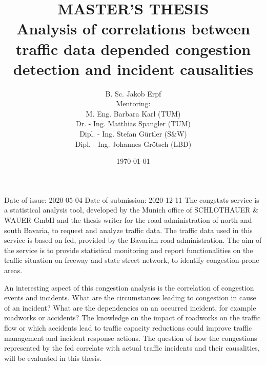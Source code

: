 \documentclass[a4paper,12pt]{report}
\begin{document}
\showthe\textwidth

\title{MASTER'S THESIS\\
[1cm]
\smaller Analysis of correlations between traffic data depended congestion detection and incident causalities}
\author{
B. Sc. Jakob Erpf\\ 
[1cm]
\small Mentoring:\\ 
\small M. Eng. Barbara Karl (TUM)\\ 
\small Dr. - Ing. Matthias Spangler (TUM)\\ 
\small Dipl. - Ing. Stefan Gürtler (S\&W)\\
\small Dipl. - Ing. Johannes Grötsch (LBD)
}
\date{\today}
\maketitle

\clearpage

\renewcommand\abstractname{Topic}
\abstract{}
Date of issue: 2020-05-04\newline
Date of submission:	2020-12-11\newline
\newline
The \gls{congstats} service is a statistical analysis tool, developed by the Munich office of SCHLOTHAUER \& WAUER GmbH and the thesis writer for the road administration of north and south Bavaria, to request and analyze traffic data. The traffic data used in this service is based on \acrfull{fcd}, provided by the Bavarian road administration. The aim of the service is to provide statistical monitoring and report functionalities on the traffic situation on freeway and state street network, to identify congestion-prone areas.

An interesting aspect of this congestion analysis is the correlation of congestion events and incidents. What are the circumstances leading to congestion in cause of an incident? What are the dependencies on an occurred incident, for example roadworks or accidents? The knowledge on the impact of roadworks on the traffic flow or which accidents lead to traffic capacity reductions could improve traffic management and incident response actions. The question of how the congestions represented by the \acrshort{fcd} correlate with actual traffic incidents and their causalities, will be evaluated in this thesis. 
\end{document}
